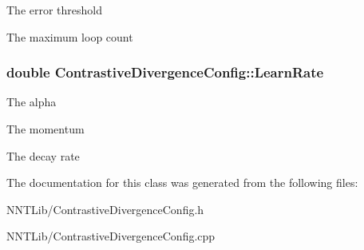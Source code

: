 The error threshold 

The maximum loop count \hypertarget{class_contrastive_divergence_config_a826b90a2f85b952d7c633589b9574e52}{}
\subsubsection[{Learn\+Rate}]{\setlength{\rightskip}{0pt plus 5cm}double Contrastive\+Divergence\+Config\+::\+Learn\+Rate}\label{class_contrastive_divergence_config_a826b90a2f85b952d7c633589b9574e52}


The alpha 

The momentum 

The decay rate 

The documentation for this class was generated from the following files\+:\begin{DoxyCompactItemize}
\item 
N\+N\+T\+Lib/Contrastive\+Divergence\+Config.\+h\item 
N\+N\+T\+Lib/Contrastive\+Divergence\+Config.\+cpp\end{DoxyCompactItemize}
